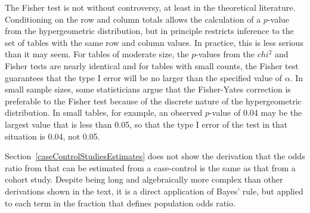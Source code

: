 The Fisher test is not without controversy, at least in the theoretical literature.  Conditioning on the row and column totals allows the calculation of a $p$-value from the hypergeometric distribution, but in principle restricts inference to the set of tables with the same row and column values.  In practice, this is less serious than it may seem. For tables of moderate size, the $p$-values from the $chi^2$ and Fisher tests are nearly identical and for tables with small counts, the Fisher test guarantees that the type I error will be no larger than the specified value of $\alpha$.   In small sample sizes, some statisticians argue that the Fisher-Yates correction is preferable to the Fisher test because of the discrete nature of the hypergeometric distribution.  In small tables, for example, an observed $p$-value of 0.04 may be the largest value that is less than 0.05, so that the type I error of the test in that situation is 0.04, not 0.05.

Section~\ref{caseControlStudiesEstimates} does not show the derivation that the odds ratio from that can be estimated from a  case-control  is the same as that from a cohort study. Despite being long and algebraically more complex than other derivations shown in the text, it is a direct application of Bayes' rule, but applied to each term in the fraction that defines population odds ratio.

